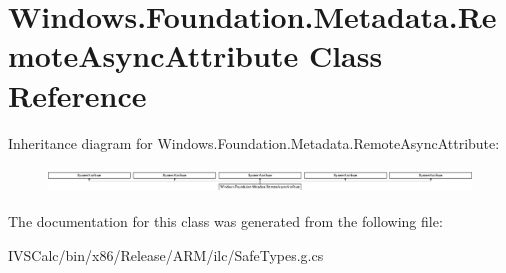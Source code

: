 \hypertarget{class_windows_1_1_foundation_1_1_metadata_1_1_remote_async_attribute}{}\section{Windows.\+Foundation.\+Metadata.\+Remote\+Async\+Attribute Class Reference}
\label{class_windows_1_1_foundation_1_1_metadata_1_1_remote_async_attribute}
Inheritance diagram for Windows.\+Foundation.\+Metadata.\+Remote\+Async\+Attribute\+:\begin{figure}[H]
\begin{center}
\leavevmode
\includegraphics[height=0.697819cm]{class_windows_1_1_foundation_1_1_metadata_1_1_remote_async_attribute}
\end{center}
\end{figure}


The documentation for this class was generated from the following file\+:\begin{DoxyCompactItemize}
\item 
I\+V\+S\+Calc/bin/x86/\+Release/\+A\+R\+M/ilc/Safe\+Types.\+g.\+cs\end{DoxyCompactItemize}
